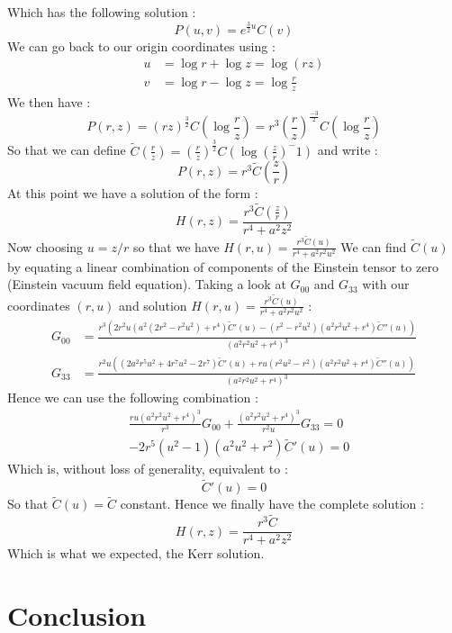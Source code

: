 \documentclass[a4paper,12pt]{article}
\theoremstyle{definition}
\begin{document}
Which has the following solution :
\begin{equation}
	P(u,v)=e^{\frac{3}{2}u}C(v)
\end{equation}
We can go back to our origin coordinates using :
\begin{equation}
\begin{split}
	u&=\log{r} + \log{z}=\log{(rz)}\\
	v&=\log{r} - \log{z}=\log{\frac{r}{z}}
\end{split}
\end{equation}
We then have :
\begin{equation}
	P(r,z)=(rz)^\frac{3}{2}C(\log{\frac{r}{z}})=r^3(\frac{r}{z})^\frac{-3}{2}C(\log{\frac{r}{z}})
\end{equation}
So that we can define $\tilde C(\frac{r}{z})=(\frac{r}{z})^\frac{3}{2}C(\log{(\frac{z}{r})^-1})$ and write :
\begin{equation}
	P(r,z)=r^3\tilde C(\frac{z}{r})
\end{equation}
At this point we have a solution of the form :
\begin{equation}
	H(r,z)=\frac{r^3\tilde C(\frac{z}{r})}{r^4+a^2z^2}
\end{equation}
Now choosing $u=z/r$ so that we have $H(r,u)=\frac{r^3\tilde C(u)}{r^4+a^2r^2u^2}$
We can find $\tilde C(u)$ by equating a linear combination of components of the Einstein tensor to zero (Einstein vacuum field equation).
Taking a look at $G_{00}$ and $G_{33}$ with our coordinates $(r,u)$ and solution $H(r,u)=\frac{r^3\tilde C(u)}{r^4+a^2r^2u^2}$ :
\begin{equation}
\begin{split}
	G_{00}&=\frac{r^3 (2 r^2 u (a^2 (2 r^2-r^2
	u^2)+r^4) \tilde C'(u)-(r^2-r^2
	u^2) (a^2 r^2 u^2+r^4)
	\tilde C''(u))}{(a^2 r^2
	u^2+r^4)^3}\\
	G_{33}&=\frac{r^2 u ((2 a^2 r^5
   u^2+4 r^7 u^2-2 r^7)\tilde C'(u)+r u (r^2 u^2-r^2) (a^2
   r^2 u^2+r^4) \tilde C''(u)
   )}{(a^2 r^2 u^2+r^4)^3}
\end{split}
\end{equation}
Hence we can use the following combination :
\begin{equation}
\begin{split}
	&\frac{ru(a^2 r^2 u^2+r^4)^3}{r^3}G_{00}+\frac{(a^2 r^2 u^2+r^4)^3}{r^2u}G_{33}=0\\
	&-2 r^5 (u^2-1) (a^2 u^2+r^2)\tilde C'(u)=0
\end{split}
\end{equation}
Which is, without loss of generality, equivalent to :
\begin{equation}
	\tilde C'(u)=0
\end{equation}
So that $\tilde C(u)=\tilde C$ constant. Hence we finally have the complete solution :
\begin{equation}
	H(r,z)=\frac{r^3\tilde C}{r^4+a^2z^2}
\end{equation}
Which is what we expected, the Kerr solution.

\section{Conclusion}
\end{document}
